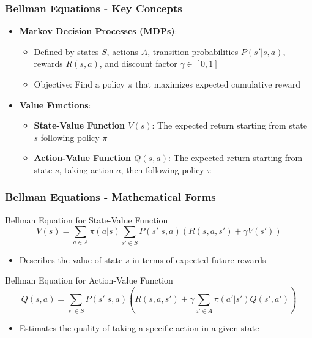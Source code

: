 \documentclass[aspectratio=169]{beamer}
\begin{document}
\begin{frame}[fragile]
    \frametitle{Bellman Equations - Key Concepts}
    \begin{itemize}
        \item \textbf{Markov Decision Processes (MDPs)}:
            \begin{itemize}
                \item Defined by states \( S \), actions \( A \), transition probabilities \( P(s'|s, a) \), rewards \( R(s, a) \), and discount factor \( \gamma \in [0, 1] \)
                \item Objective: Find a policy \( \pi \) that maximizes expected cumulative reward
            \end{itemize}
        \item \textbf{Value Functions}:
            \begin{itemize}
                \item \textbf{State-Value Function \( V(s) \)}: The expected return starting from state \( s \) following policy \( \pi \)
                \item \textbf{Action-Value Function \( Q(s,a) \)}: The expected return starting from state \( s \), taking action \( a \), then following policy \( \pi \)
            \end{itemize}
    \end{itemize}
\end{frame}

\begin{frame}[fragile]
    \frametitle{Bellman Equations - Mathematical Forms}
    \begin{block}{Bellman Equation for State-Value Function}
        \begin{equation}
            V(s) = \sum_{a \in A} \pi(a|s) \sum_{s' \in S} P(s'|s, a) \left( R(s, a, s') + \gamma V(s') \right)
        \end{equation}
        \begin{itemize}
            \item Describes the value of state \( s \) in terms of expected future rewards
        \end{itemize}
    \end{block}

    \begin{block}{Bellman Equation for Action-Value Function}
        \begin{equation}
            Q(s, a) = \sum_{s' \in S} P(s'|s, a) \left( R(s, a, s') + \gamma \sum_{a' \in A} \pi(a'|s') Q(s', a') \right)
        \end{equation}
        \begin{itemize}
            \item Estimates the quality of taking a specific action in a given state
        \end{itemize}
    \end{block}
\end{frame}
\end{document}
